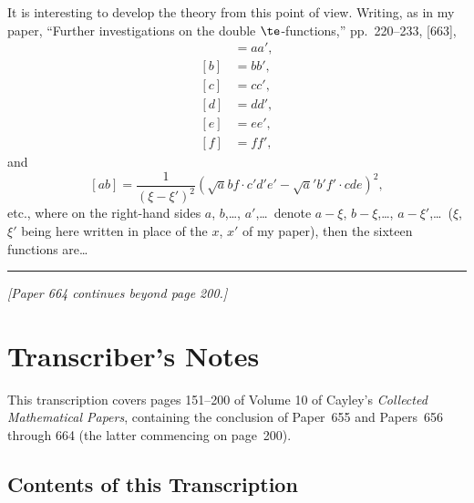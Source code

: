 \documentclass[11pt,a4paper]{book}
\begin{document}
It is interesting to develop the theory from this point of view. Writing, as in my paper, ``Further investigations on the double $\te$-functions,'' pp.~220--233, [663],
\begin{align*}
[a] &= aa', \\
[b] &= bb', \\
[c] &= cc', \\
[d] &= dd', \\
[e] &= ee', \\
[f] &= ff',
\end{align*}
and
\[
[ab] = \frac{1}{(\xi - \xi')^2} (\surd abf \cdot c'd'e' - \surd a'b'f' \cdot cde)^2,
\]
etc., where on the right-hand sides $a$, $b$,\ldots, $a'$,\ldots\ denote $a - \xi$, $b - \xi$,\ldots, $a - \xi'$,\ldots\ ($\xi$, $\xi'$ being here written in place of the $x$, $x'$ of my paper), then the sixteen functions are\ldots

\smallskip
\noindent\rule{0.6\textwidth}{0.4pt}

\begin{center}
\textit{[Paper 664 continues beyond page 200.]}
\end{center}

\newpage
\section*{Transcriber's Notes}

This transcription covers pages 151--200 of Volume 10 of Cayley's \emph{Collected Mathematical Papers}, containing the conclusion of Paper~655 and Papers~656 through 664 (the latter commencing on page~200).

\subsection*{Contents of this Transcription}
\end{document}
